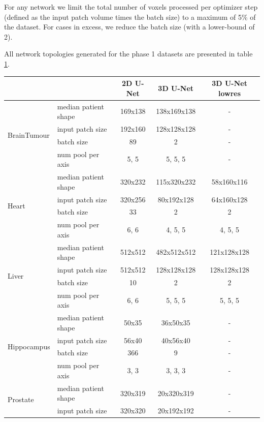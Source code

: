 \documentclass{templates/llncs} %
\begin{document}
    For any network we limit the total number of voxels processed per optimizer step (defined as the input patch volume times the batch size) to a maximum of 5\% of the dataset. For cases in excess, we reduce the batch size (with a lower-bound of 2). 

    All network topologies generated for the phase 1 datasets are presented in table \ref{segmentation_architectures}.
    
    \begin{table}[t]
    \label{segmentation_architectures}
    \scriptsize
    \begin{tabular}{ll|ccc}
    & & 2D U-Net & 3D U-Net & 3D U-Net lowres \\
    \hline
    \multirow{4}{*}{BrainTumour} & median patient shape & 169x138 & 138x169x138 & - \\
     & input patch size & 192x160 & 128x128x128 & - \\
     & batch size & 89 & 2 & - \\
     & num pool per axis & 5, 5 & 5, 5, 5 & - \\
     \hline
    \multirow{4}{*}{Heart} & median patient shape & 320x232 & 115x320x232 & 58x160x116 \\
     & input patch size & 320x256 & 80x192x128 & 64x160x128 \\
     & batch size & 33 & 2 & 2 \\
     & num pool per axis & 6, 6 & 4, 5, 5 & 4, 5, 5 \\
    \hline
    \multirow{4}{*}{Liver} & median patient shape & 512x512 & 482x512x512 & 121x128x128 \\
     & input patch size & 512x512 & 128x128x128 & 128x128x128 \\
     & batch size & 10 & 2 & 2 \\
     & num pool per axis & 6, 6 & 5, 5, 5 & 5, 5, 5 \\
    \hline
    \multirow{4}{*}{Hippocampus} & median patient shape & 50x35 & 36x50x35 & - \\
     & input patch size & 56x40 & 40x56x40 & - \\
     & batch size & 366 & 9 & - \\
     & num pool per axis & 3, 3 & 3, 3, 3 & - \\
    \hline
    \multirow{4}{*}{Prostate} & median patient shape & 320x319 & 20x320x319 & - \\
     & input patch size & 320x320 & 20x192x192 & - \\

\end{tabular}
\end{table}
\end{document}
